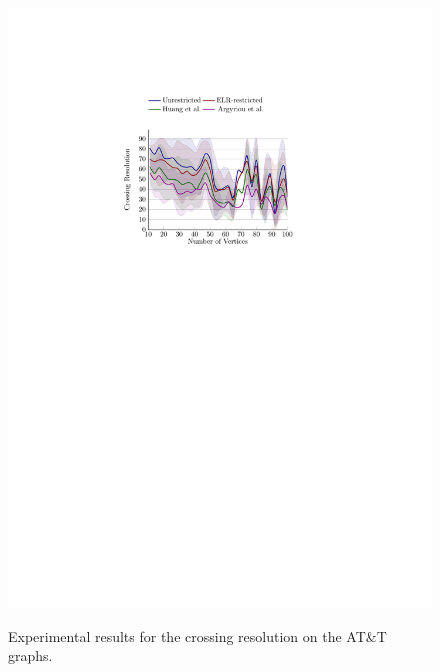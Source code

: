 \documentclass{comjnl}
\begin{document}
\begin{figure}[t!]
{	\includegraphics[scale=0.99,page=4]{figures/north_colored}}
	\caption{Experimental results for the crossing resolution on the AT\&T graphs.}
	\label{fig:northCrossing}
\end{figure}
\end{document}

